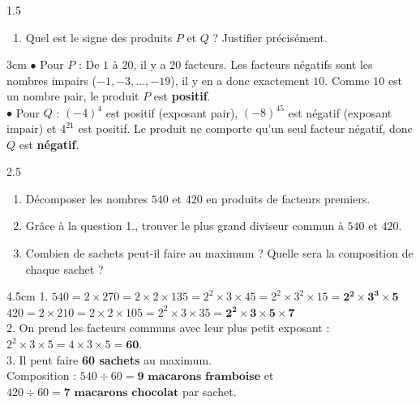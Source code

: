 \documentclass[a4paper]{book}
\begin{document}
{    \begin{exerciceNote}{1.5}
        \begin{enumerate}
            \item Quel est le signe des produits $P$ et $Q$ ? Justifier précisément.
        \end{enumerate}
        \begin{ZoneReponse}{3cm}
        $\bullet$ Pour $P$ : De $1$ à $20$, il y a $20$ facteurs. Les facteurs négatifs sont les nombres impairs ($-1, -3, \dots, -19$), il y en a donc exactement $10$. Comme $10$ est un nombre pair, le produit $P$ est \textbf{positif}. \\
        $\bullet$ Pour $Q$ : $(-4)^4$ est positif (exposant pair), $(-8)^{45}$ est négatif (exposant impair) et $4^{21}$ est positif. Le produit ne comporte qu'un seul facteur négatif, donc $Q$ est \textbf{négatif}.
        \end{ZoneReponse}
    \end{exerciceNote}
    
    
    \begin{exerciceNote}{2.5}
        \begin{enumerate}
            \item Décomposer les nombres $540$ et $420$ en produits de facteurs premiers.
            \item Grâce à la question 1., trouver le plus grand diviseur commun à $540$ et $420$.
            \item Combien de sachets peut-il faire au maximum ? Quelle sera la composition de chaque sachet ?
        \end{enumerate}
        \begin{ZoneReponse}{4.5cm}
        1. $540 = 2 \times 270 = 2 \times 2 \times 135 = 2^2 \times 3 \times 45 = 2^2 \times 3^2 \times 15 = \mathbf{2^2 \times 3^3 \times 5}$ \\
        \phantom{1. }$420 = 2 \times 210 = 2 \times 2 \times 105 = 2^2 \times 3 \times 35 = \mathbf{2^2 \times 3 \times 5 \times 7}$ \\
        2. On prend les facteurs communs avec leur plus petit exposant : $2^2 \times 3 \times 5 = 4 \times 3 \times 5 = \mathbf{60}$. \\
        3. Il peut faire \textbf{60 sachets} au maximum. \\
        \phantom{3. }Composition : $540 \div 60 = \mathbf{9\text{ macarons framboise}}$ et $420 \div 60 = \mathbf{7\text{ macarons chocolat}}$ par sachet.
        \end{ZoneReponse}
    \end{exerciceNote}
    
}
\end{document}
